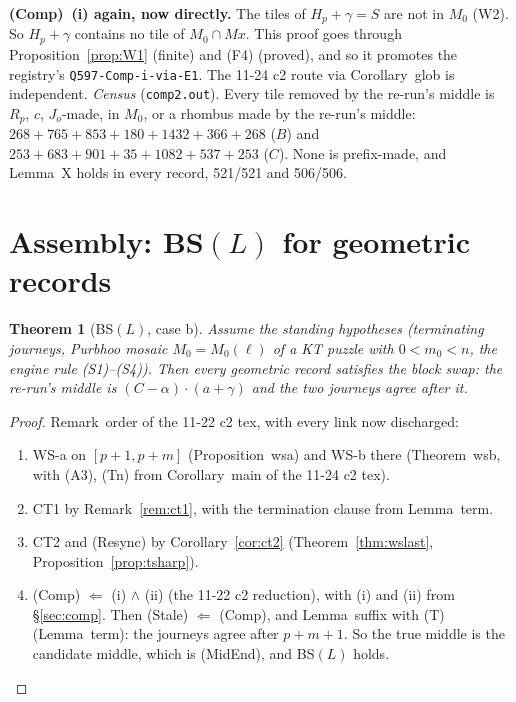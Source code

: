 \documentclass[11pt]{article}
\newtheorem{theorem}{Theorem}\newtheorem{lemma}[theorem]{Lemma}\newtheorem{proposition}[theorem]{Proposition}
\theoremstyle{definition}\newtheorem{definition}[theorem]{Definition}\newtheorem{remark}[theorem]{Remark}
\begin{document}
\noindent\textbf{(Comp)~(i) again, now directly.} The tiles of $H_p+\gamma=S$ are not in $M_0$ (W2). So $H_p+\gamma$ contains no tile of $M_0\cap Mx$. This proof goes through Proposition~\ref{prop:W1} (finite) and (F4) (proved), and so it promotes the registry's \texttt{Q597-Comp-i-via-E1}. The 11-24 c2 route via Corollary~glob is independent.
\emph{Census} (\texttt{comp2.out}). Every tile removed by the re-run's middle is $R_p$, $c$, $J_o$-made, in $M_0$, or a rhombus made by the re-run's middle: $268+765+853+180+1432+366+268$ ($B$) and $253+683+901+35+1082+537+253$ ($C$). None is prefix-made, and Lemma~X holds in every record, 521/521 and 506/506.

\section{Assembly: BS$(L)$ for geometric records}\label{sec:assembly}
\begin{theorem}[BS$(L)$, case b]\label{thm:bs}
Assume the standing hypotheses (terminating journeys, Purbhoo mosaic $M_0=M_0(\ell)$ of a KT puzzle with $0<m_0<n$, the engine rule (S1)--(S4)). Then every geometric record satisfies the block swap: the re-run's middle is $(C-\alpha)\cdot(a+\gamma)$ and the two journeys agree after it.
\end{theorem}
\begin{proof}
Remark~order of the 11-22 c2 tex, with every link now discharged:
\begin{enumerate}
\item WS-a on $[p+1,p+m]$ (Proposition~wsa) and WS-b there (Theorem~wsb, with (A3), (Tn) from Corollary~main of the 11-24 c2 tex).
\item CT1 by Remark~\ref{rem:ct1}, with the termination clause from Lemma~term.
\item CT2 and (Resync) by Corollary~\ref{cor:ct2} (Theorem~\ref{thm:wslast}, Proposition~\ref{prop:tsharp}).
\item (Comp) $\Leftarrow$ (i) $\wedge$ (ii) (the 11-22 c2 reduction), with (i) and (ii) from \S\ref{sec:comp}. Then (Stale) $\Leftarrow$ (Comp), and Lemma~suffix with (T) (Lemma~term): the journeys agree after $p+m+1$. So the true middle is the candidate middle, which is (MidEnd), and BS$(L)$ holds.
\end{enumerate}
\end{proof}
\end{document}
